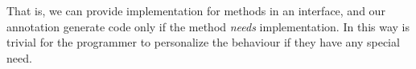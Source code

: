 That is, we can provide implementation for methods in an interface, 
and our annotation generate code only if the method \emph{needs} implementation. In this way is trivial for the programmer to personalize the behaviour if they have any special need.





%

